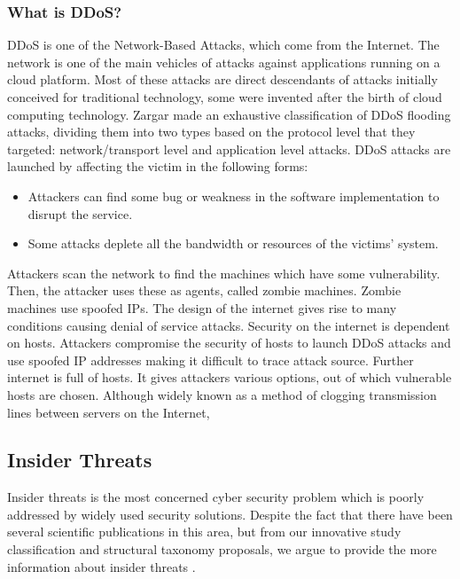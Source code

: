 \documentclass[twocolumn]{article}
\begin{document}
\subsubsection{What is DDoS?}
\par DDoS\cite{coppolino2017cloud} is one of the Network-Based Attacks, which come from the Internet. The network is one of the main vehicles of attacks against applications running on a cloud platform. Most of these attacks are direct descendants of attacks initially conceived for traditional technology, some were invented after the birth of cloud computing technology. Zargar\cite{coppolino2017cloud} made an exhaustive classification of DDoS flooding attacks, dividing them into two types based on the protocol level that they targeted: network/transport level and application level attacks. DDoS attacks are launched by affecting the victim in the following forms:
    \begin{itemize}
        \item Attackers can find some bug or weakness in the software implementation to disrupt the service.
        \item Some attacks deplete all the bandwidth or resources of the victims' system.
    \end{itemize}
Attackers scan the network to find the machines which have some vulnerability. Then, the attacker uses these as agents, called zombie machines. Zombie machines use spoofed IPs. The design of the internet gives rise to many conditions causing denial of service attacks. Security on the internet is dependent on hosts. Attackers compromise the security of hosts to launch DDoS
attacks and use spoofed IP addresses making it difficult to trace attack source. Further internet is full of hosts. It
gives attackers various options, out of which vulnerable hosts are chosen\cite{deshmukh2015understanding}. Although widely known as a method of clogging transmission lines between servers on the Internet,








\subsection{Insider Threats}
Insider threats is the most concerned cyber security problem which is poorly addressed by widely used security solutions. Despite the fact that there have been several scientific publications in this area, but from our innovative study classification and structural taxonomy proposals, we argue to provide the more information about insider threats   \cite{singh2022systematic}.
\end{document}
